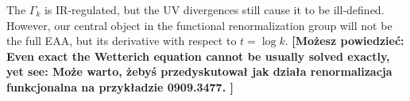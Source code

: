 \documentclass[11pt, a4paper]{article}
\newcommand{\jhkbf}[1]{\textbf{\color{red} [#1]}}
\begin{document}

The $\Gamma_k$ is IR-regulated, but the UV divergences still cause it to be ill-defined. 
However, our central object in the functional renormalization group will not be the full EAA, 
but its derivative with respect to $t = \log{k}$. 
\jhkbf{Możesz powiedzieć: Even exact the Wetterich equation cannot be usually solved exactly, yet see:
Może warto, żebyś przedyskutował jak działa renormalizacja funkcjonalna na przykładzie 0909.3477.
}
\end{document}
